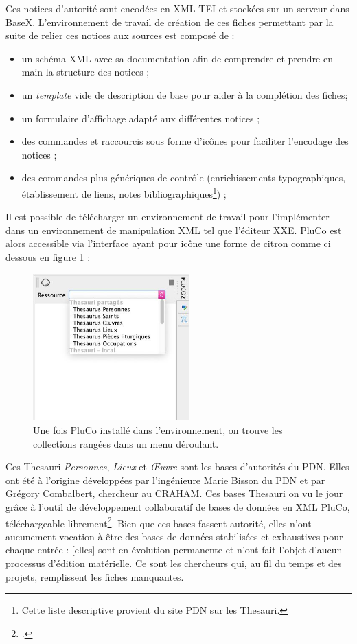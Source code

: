 \documentclass[a4paper,12pt,twoside]{book}
\begin{document}
Ces notices d'autorité sont encodées en XML-TEI et stockées sur un serveur dans BaseX. L'environnement de travail de création de ces fiches permettant par la suite de relier ces notices aux sources est composé de :
\begin{itemize}
    \item un schéma XML avec sa documentation afin de comprendre et prendre en main la structure des notices ;
    \item un \textit{template} vide de description de base pour aider à la complétion des fiches;
    \item un formulaire d'affichage adapté aux différentes notices ;
    \item des commandes et raccourcis sous forme d'icônes pour faciliter l'encodage des notices ;
    \item des commandes plus génériques de contrôle (enrichissements typographiques, établissement de liens, notes bibliographiques\footnote{Cette liste descriptive provient du site \acrshort{PDN} sur les Thesauri.}) ;
\end{itemize}

Il est possible de télécharger un environnement de travail pour l'implémenter dans un environnement de manipulation XML tel que l'éditeur \acrshort{XXE}. PluCo est alors accessible via l'interface ayant pour icône une forme de citron comme ci dessous en figure \ref{citron} :

\begin{figure}
    \centering
    \includegraphics[width=6cm]{img/partie_3/pluco.JPG}
    \caption{Une fois PluCo installé dans l'environnement, on trouve les collections rangées dans un menu déroulant.}
    \label{citron}
\end{figure}


Ces Thesauri \textit{Personnes}, \textit{Lieux} et \textit{\OE{}uvre} sont les bases d'autorités du \acrshort{PDN}. Elles ont été à l'origine développées par l'ingénieure Marie Bisson du \acrshort{PDN} et par Grégory Combalbert, chercheur au \acrshort{CRAHAM}. Ces bases Thesauri on vu le jour grâce à l'outil de développement collaboratif de bases de données en XML \acrshort{PluCo}, téléchargeable librement\footcite{pluco}. Bien que ces bases fassent autorité, elles n'ont aucunement vocation à être des \og bases de données stabilisées et exhaustives pour chaque entrée : [elles] sont en évolution permanente et n'ont fait l'objet d'aucun processus d'édition matérielle\fg. Ce sont les chercheurs qui, au fil du temps et des projets, remplissent les fiches manquantes.
\end{document}

